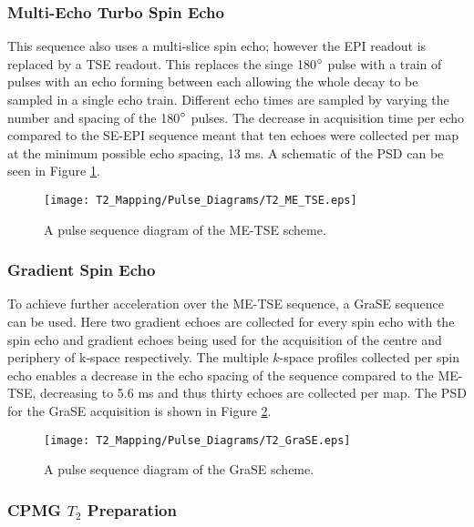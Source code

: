 \subsubsection{Multi-Echo Turbo Spin Echo}
This sequence also uses a multi-slice spin echo; however the \ac{EPI} readout is replaced by a \ac{TSE} readout. This replaces the singe 180$\degree$ pulse with a train of pulses with an echo forming between each allowing the whole \ttwo decay to be sampled in a single echo train. Different echo times are sampled by varying the number and spacing of the 180$\degree$ pulses. The decrease in acquisition time per echo compared to the \ac{SE}-\ac{EPI} sequence meant that ten echoes were collected per \ttwo map at the minimum possible echo spacing, 13 ms. A schematic of the \ac{PSD} can be seen in Figure \ref{fig:t2_me-tse_seq}.

\begin{figure}[H]
	\centering
	\texttt{[image: T2\_Mapping/Pulse\_Diagrams/T2\_ME\_TSE.eps]}
	\caption{A pulse sequence diagram of the \ac{ME-TSE} scheme.}
	\label{fig:t2_me-tse_seq}	
\end{figure}

\subsubsection{Gradient Spin Echo}

To achieve further acceleration over the \ac{ME-TSE} sequence, a \ac{GraSE} sequence can be used. Here two gradient echoes are collected for every spin echo with the spin echo and gradient echoes being used for the acquisition of the centre and periphery of k-space respectively. The multiple $k$-space profiles collected per spin echo enables a decrease in the echo spacing of the sequence compared to the \ac{ME-TSE}, decreasing to 5.6 ms and thus thirty echoes are collected per \ttwo map. The \ac{PSD} for the \ac{GraSE} acquisition is shown in Figure \ref{fig:t2_grase_seq}.

\begin{figure}[H]
	\centering
	\texttt{[image: T2\_Mapping/Pulse\_Diagrams/T2\_GraSE.eps]}
	\caption{A pulse sequence diagram of the \ac{GraSE} scheme.}
	\label{fig:t2_grase_seq}	
\end{figure}

\subsubsection{CPMG $T_2$ Preparation}

